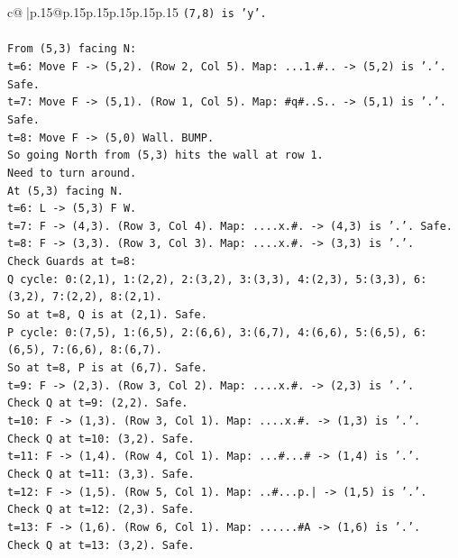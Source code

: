 \documentclass{article}
\begin{document}
{\begin{supertabular}{c@{$\;$}|p{.15\linewidth}@{}p{.15\linewidth}p{.15\linewidth}p{.15\linewidth}p{.15\linewidth}p{.15\linewidth}}
{{{\texttt{(7,8) is 'y'.} \\
\\ 
\texttt{From (5,3) facing N:} \\
\texttt{t=6: Move F {-}> (5,2). (Row 2, Col 5). Map: ...1.\#.. {-}> (5,2) is '.'. Safe.} \\
\texttt{t=7: Move F {-}> (5,1). (Row 1, Col 5). Map: \#q\#..S.. {-}> (5,1) is '.'. Safe.} \\
\texttt{t=8: Move F {-}> (5,0) Wall. BUMP.} \\
\texttt{So going North from (5,3) hits the wall at row 1.} \\
\texttt{Need to turn around.} \\
\texttt{At (5,3) facing N.} \\
\texttt{t=6: L {-}> (5,3) F W.} \\
\texttt{t=7: F {-}> (4,3). (Row 3, Col 4). Map: ....x.\#. {-}> (4,3) is '.'. Safe.} \\
\texttt{t=8: F {-}> (3,3). (Row 3, Col 3). Map: ....x.\#. {-}> (3,3) is '.'.} \\
\texttt{Check Guards at t=8:} \\
\texttt{Q cycle: 0:(2,1), 1:(2,2), 2:(3,2), 3:(3,3), 4:(2,3), 5:(3,3), 6:(3,2), 7:(2,2), 8:(2,1).} \\
\texttt{So at t=8, Q is at (2,1). Safe.} \\
\texttt{P cycle: 0:(7,5), 1:(6,5), 2:(6,6), 3:(6,7), 4:(6,6), 5:(6,5), 6:(6,5), 7:(6,6), 8:(6,7).} \\
\texttt{So at t=8, P is at (6,7). Safe.} \\
\texttt{t=9: F {-}> (2,3). (Row 3, Col 2). Map: ....x.\#. {-}> (2,3) is '.'.} \\
\texttt{Check Q at t=9: (2,2). Safe.} \\
\texttt{t=10: F {-}> (1,3). (Row 3, Col 1). Map: ....x.\#. {-}> (1,3) is '.'.} \\
\texttt{Check Q at t=10: (3,2). Safe.} \\
\texttt{t=11: F {-}> (1,4). (Row 4, Col 1). Map: ...\#...\# {-}> (1,4) is '.'.} \\
\texttt{Check Q at t=11: (3,3). Safe.} \\
\texttt{t=12: F {-}> (1,5). (Row 5, Col 1). Map: ..\#...p.| {-}> (1,5) is '.'.} \\
\texttt{Check Q at t=12: (2,3). Safe.} \\
\texttt{t=13: F {-}> (1,6). (Row 6, Col 1). Map: ......\#A {-}> (1,6) is '.'.} \\
\texttt{Check Q at t=13: (3,2). Safe.} \\
}}}
\end{supertabular}}
\end{document}

